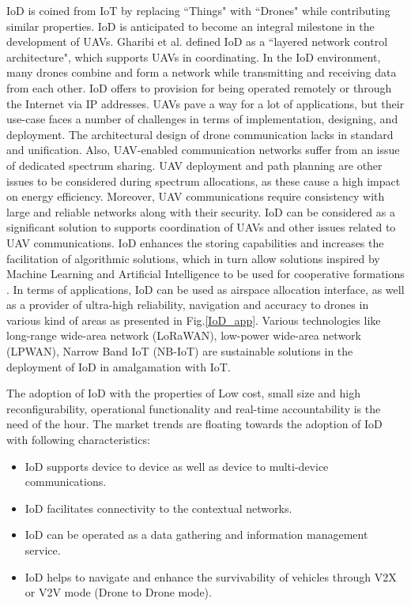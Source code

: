 \documentclass{easychair}
\begin{document}
IoD is coined from IoT by replacing ``Things" with ``Drones" while contributing similar properties. IoD is anticipated to become an integral milestone in the development of UAVs. Gharibi et al. \cite{gharibi2016internet} defined IoD as a “layered network control architecture", which supports UAVs in coordinating. In the IoD environment, many drones combine and form a network while transmitting and receiving data from each other. IoD offers to provision for being operated remotely or through the Internet via IP addresses.
UAVs pave a way for a lot of applications, but their use-case faces a number of challenges in terms of implementation, designing, and deployment. The architectural design of drone communication lacks in standard and unification. Also, UAV-enabled communication networks suffer from an issue of dedicated spectrum sharing. UAV deployment and path planning are other issues to be considered during spectrum allocations, as these cause a high impact on energy efficiency. Moreover, UAV communications require consistency with large and reliable networks along with their security. IoD can be considered as a significant solution to supports coordination of UAVs and other issues related to UAV communications. IoD enhances the storing capabilities and increases the facilitation of algorithmic solutions, which in turn allow solutions inspired by Machine Learning and Artificial Intelligence to be used for cooperative formations \cite{chen2017liquid}.
In terms of applications, IoD can be used as airspace allocation interface, as well as a provider of ultra-high reliability, navigation and accuracy to drones in various kind of areas as presented in Fig.\ref{IoD_app}. Various technologies like long-range wide-area network (LoRaWAN), low-power wide-area network (LPWAN), Narrow Band IoT (NB-IoT) are sustainable solutions in the deployment of IoD in amalgamation with IoT\cite{you2018enhanced}.

The adoption of IoD with the properties of Low cost, small size and high reconfigurability, operational functionality and real-time accountability is the need of the hour\cite{hall2016internet}.  The market trends are floating towards the adoption of IoD with following characteristics:
\begin{itemize}
\item  IoD supports device to device as well as device to multi-device communications.
\item  IoD facilitates connectivity to the contextual networks.
\item  IoD can be operated as a data gathering and information management service.
\item IoD helps to navigate and enhance the survivability of vehicles through V2X or V2V mode (Drone to Drone mode).
\end{itemize}
\end{document}

